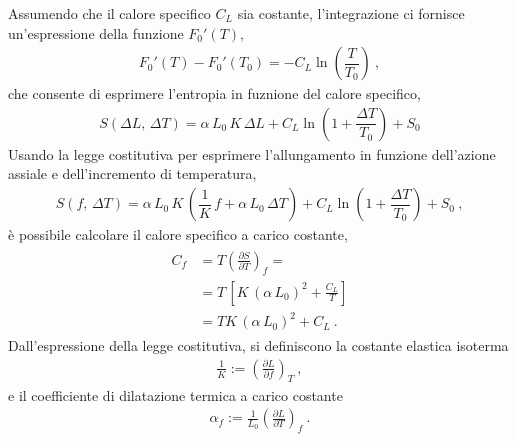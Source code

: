 \documentclass[letterpaper,10pt,italian]{jupyterBook}
\begin{document}
Assumendo che il calore specifico \(C_L\) sia costante, l’integrazione ci fornisce un’espressione della funzione \(F_0'(T)\),
\begin{equation*}
\begin{split}F_0'(T) - F_0'(T_0) = - C_L \ln \left( \dfrac{T}{T_0} \right) \ ,\end{split}
\end{equation*}
\sphinxAtStartPar
che consente di esprimere l’entropia in fuznione del calore specifico,
\begin{equation*}
\begin{split}S(\Delta L, \, \Delta T) = \alpha \, L_0 \, K \, \Delta L + C_L \ln \left( 1 + \dfrac {\Delta T}{T_0} \right) + S_0\end{split}
\end{equation*}
\sphinxAtStartPar
Usando la legge costitutiva per esprimere l’allungamento in funzione dell’azione assiale e dell’incremento di temperatura,
\begin{equation*}
\begin{split}S(f, \, \Delta T) = \alpha \, L_0 \, K \, \left( \dfrac{1}{K} \, f + \alpha \, L_0 \, \Delta T \right) + C_L \ln \left( 1 + \dfrac {\Delta T}{T_0} \right) + S_0 \ ,\end{split}
\end{equation*}
\sphinxAtStartPar
è possibile calcolare il calore specifico a carico costante,
\begin{equation*}
\begin{split}\begin{aligned}
C_f & = T \left(\frac{\partial S}{\partial T} \right)_f = \\
    & = T \, \left[ K \, ( \alpha \, L_0 )^2 + \frac{C_L}{T}\right] \\
    & = T K \, ( \alpha \, L_0 )^2 + C_L \ .
\end{aligned}\end{split}
\end{equation*}
\sphinxAtStartPar
{}
Dall’espressione della legge costitutiva, si definiscono la costante elastica isoterma
\begin{equation*}
\begin{split}\frac{1}{K} := \left(\frac{\partial L}{\partial f}\right)_T \ ,\end{split}
\end{equation*}
\sphinxAtStartPar
e il coefficiente di dilatazione termica a carico costante
\begin{equation*}
\begin{split}\alpha_f := \frac{1}{L_0} \left(\frac{\partial L}{\partial T}\right)_f \ .\end{split}
\end{equation*}
\end{document}
